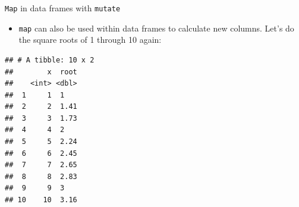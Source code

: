 \documentclass[ignorenonframetext,]{beamer}
\newenvironment{Shaded}{\begin{snugshade}}{\end{snugshade}}
\newcommand{\DataTypeTok}[1]{\textcolor[rgb]{0.13,0.29,0.53}{#1}}
\newcommand{\DecValTok}[1]{\textcolor[rgb]{0.00,0.00,0.81}{#1}}
\newcommand{\KeywordTok}[1]{\textcolor[rgb]{0.13,0.29,0.53}{\textbf{#1}}}
\newcommand{\NormalTok}[1]{#1}
\newcommand{\OperatorTok}[1]{\textcolor[rgb]{0.81,0.36,0.00}{\textbf{#1}}}
\newcommand{\StringTok}[1]{\textcolor[rgb]{0.31,0.60,0.02}{#1}}
\providecommand{\tightlist}{%
  \setlength{\itemsep}{0pt}\setlength{\parskip}{0pt}}
\begin{document}
\begin{frame}[fragile]{\texttt{Map} in data frames with \texttt{mutate}}
\protect\hypertarget{map-in-data-frames-with-mutate}{}

\begin{itemize}
\tightlist
\item
  \texttt{map} can also be used within data frames to calculate new
  columns. Let's do the square roots of 1 through 10 again:
\end{itemize}

\begin{Shaded}
\end{Shaded}

\begin{verbatim}
## # A tibble: 10 x 2
##        x  root
##    <int> <dbl>
##  1     1  1   
##  2     2  1.41
##  3     3  1.73
##  4     4  2   
##  5     5  2.24
##  6     6  2.45
##  7     7  2.65
##  8     8  2.83
##  9     9  3   
## 10    10  3.16
\end{verbatim}

\end{frame}
\end{document}

